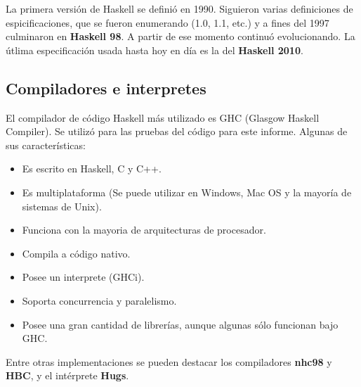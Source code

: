 La primera versión de Haskell se definió en 1990. Siguieron varias definiciones de espicificaciones, que se fueron enumerando (1.0, 1.1, etc.) y a fines del 1997 culminaron en \textbf{Haskell 98}. A partir de ese momento continuó evolucionando. La útlima especificación usada hasta hoy en día es la del \textbf{Haskell 2010}.


\subsection{Compiladores e interpretes} %
\label{sub:compiladores_e_interpretes}

El compilador de código Haskell más utilizado es GHC (Glasgow Haskell Compiler). Se utilizó para las pruebas del código para este informe. Algunas de sus características:

\begin{itemize}
  \item Es escrito en Haskell, C y C++.
  \item Es multiplataforma (Se puede utilizar en Windows, Mac OS y la mayoría de sistemas de Unix).
  \item Funciona con la mayoria de arquitecturas de procesador.
  \item Compila a código nativo.
  \item Posee un interprete (GHCi).
  \item Soporta concurrencia y paralelismo.
  \item Posee una gran cantidad de librerías, aunque algunas sólo funcionan bajo GHC.
\end{itemize}

Entre otras implementaciones se pueden destacar los compiladores \textbf{nhc98} y \textbf{HBC}, y el intérprete \textbf{Hugs}.


